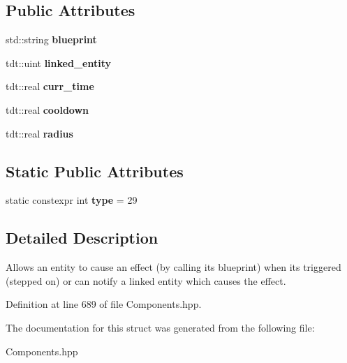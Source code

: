 \subsection*{Public Attributes}
\begin{DoxyCompactItemize}
\item 
std\+::string {\bfseries blueprint}\hypertarget{struct_trigger_component_a81ecf61f5d0b78a090f9f629ca405983}{}\label{struct_trigger_component_a81ecf61f5d0b78a090f9f629ca405983}

\item 
tdt\+::uint {\bfseries linked\+\_\+entity}\hypertarget{struct_trigger_component_abe1d482416c37c036e063c7029c5afbc}{}\label{struct_trigger_component_abe1d482416c37c036e063c7029c5afbc}

\item 
tdt\+::real {\bfseries curr\+\_\+time}\hypertarget{struct_trigger_component_a15eba334acdb1f5ca98980e3f7d4305c}{}\label{struct_trigger_component_a15eba334acdb1f5ca98980e3f7d4305c}

\item 
tdt\+::real {\bfseries cooldown}\hypertarget{struct_trigger_component_a6aca87420677e2246368f579478d70f3}{}\label{struct_trigger_component_a6aca87420677e2246368f579478d70f3}

\item 
tdt\+::real {\bfseries radius}\hypertarget{struct_trigger_component_aaf5f933e332c4e73fa3288f815c454c9}{}\label{struct_trigger_component_aaf5f933e332c4e73fa3288f815c454c9}

\end{DoxyCompactItemize}
\subsection*{Static Public Attributes}
\begin{DoxyCompactItemize}
\item 
static constexpr int {\bfseries type} = 29\hypertarget{struct_trigger_component_a4b40ab020258339d1d28ab3a48e757cc}{}\label{struct_trigger_component_a4b40ab020258339d1d28ab3a48e757cc}

\end{DoxyCompactItemize}


\subsection{Detailed Description}
Allows an entity to cause an effect (by calling it\textquotesingle{}s blueprint) when its triggered (stepped on) or can notify a linked entity which causes the effect. 

Definition at line 689 of file Components.\+hpp.



The documentation for this struct was generated from the following file\+:\begin{DoxyCompactItemize}
\item 
Components.\+hpp\end{DoxyCompactItemize}
